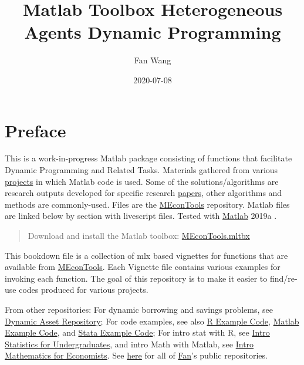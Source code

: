\documentclass[
]{book}
\title{Matlab Toolbox Heterogeneous Agents Dynamic Programming}
\author{Fan Wang}
\date{2020-07-08}
\begin{document}
\maketitle

{
\hypersetup{linkcolor=}
\setcounter{tocdepth}{1}
\tableofcontents
}
\hypertarget{preface}{%
\chapter*{Preface}\label{preface}}

This is a work-in-progress Matlab package consisting of functions that facilitate Dynamic Programming and Related Tasks. Materials gathered from various \href{https://fanwangecon.github.io/research}{projects} in which Matlab code is used. Some of the solutions/algorithms are research outputs developed for specific research \href{https://fanwangecon.github.io/research}{papers}, other algorithms and methods are commonly-used. Files are the \href{https://github.com/FanWangEcon/MEconTools}{MEconTools} repository. Matlab files are linked below by section with livescript files. Tested with \href{https://www.mathworks.com/products/matlab.html}{Matlab} 2019a \citep{matlab}.

\begin{quote}
Download and install the Matlab toolbox: \href{https://github.com/FanWangEcon/MEconTools/blob/master/MEconTools.mltbx}{MEconTools.mltbx}
\end{quote}

This bookdown file is a collection of mlx based vignettes for functions that are available from \href{https://github.com/FanWangEcon/MEconTools}{MEconTools}. Each Vignette file contains various examples for invoking each function. The goal of this repository is to make it easier to find/re-use codes produced for various projects.

From other repositories: For dynamic borrowing and savings problems, see \href{https://fanwangecon.github.io/CodeDynaAsset/}{Dynamic Asset Repository}; For code examples, see also \href{https://fanwangecon.github.io/R4Econ/}{R Example Code}, \href{https://fanwangecon.github.io/M4Econ/}{Matlab Example Code}, and \href{https://fanwangecon.github.io/Stata4Econ/}{Stata Example Code}; For intro stat with R, see \href{https://fanwangecon.github.io/Stat4Econ/}{Intro Statistics for Undergraduates}, and intro Math with Matlab, see \href{https://fanwangecon.github.io/Math4Econ/}{Intro Mathematics for Economists}. See \href{https://github.com/FanWangEcon}{here} for all of \href{https://fanwangecon.github.io/}{Fan}'s public repositories.
\end{document}
